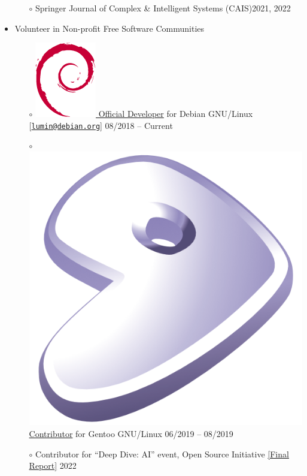 \documentclass[10pt,margin,line,pifont,palatino,courier]{res}
\newcommand{\email}[1]{\href{mailto:#1}{\tt #1}}
\begin{document}
\begin{resume}
\begin{itemize}[leftmargin=*]
\begin{itemize}[noitemsep, leftmargin=*]
		\item[$\circ$] Springer Journal of Complex \& Intelligent Systems (CAIS)\hfill 2021, 2022
	\end{itemize}
\item Volunteer in Non-profit Free Software Communities
    \begin{itemize}[noitemsep, leftmargin=*]
        \item[$\circ$] \href{https://nm.debian.org/person/lumin/}{
            \includegraphics[height=1.2\fontcharht\font`\B]{openlogo-nd-100.png}
            Official Developer} for Debian GNU/Linux {\footnotesize[\email{lumin@debian.org}]}
            \hfill 08/2018 -- Current
        \item[$\circ$] \href{https://wiki.gentoo.org/wiki/Blas-lapack-switch}{
            \includegraphics[height=1.2\fontcharht\font`\B]{gentoo-signet.png}
            Contributor} for Gentoo GNU/Linux
            \hfill 06/2019 -- 08/2019
        \item[$\circ$] Contributor for ``Deep Dive: AI'' event, Open Source Initiative
            {\footnotesize \href{https://deepdive.opensource.org/report/}{[Final Report]}}
            \hfill 2022
    \end{itemize}
\end{itemize}


\end{resume}
\end{document}
